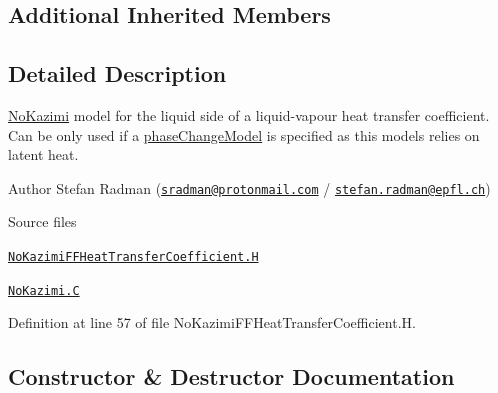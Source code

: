 \subsection*{Additional Inherited Members}


\subsection{Detailed Description}
\hyperlink{classFoam_1_1FFHeatTransferCoefficientModels_1_1NoKazimi}{No\+Kazimi} model for the liquid side of a liquid-\/vapour heat transfer coefficient. Can be only used if a \hyperlink{classFoam_1_1phaseChangeModel}{phase\+Change\+Model} is specified as this models relies on latent heat. 

\label{_Description}%
 Author Stefan Radman (\href{mailto:sradman@protonmail.com}{\tt sradman@protonmail.\+com} / \href{mailto:stefan.radman@epfl.ch}{\tt stefan.\+radman@epfl.\+ch})

\begin{DoxyParagraph}{Source files}

\begin{DoxyItemize}
\item \href{../../../home/carlo/data/GeN-Foam/GeN-Foam_ffn/GeN-Foam/GeN-Foam/classes/thermalHydraulics/src/physicsModels/heatTransferModels/FFHeatTransferCoefficientModels/NoKazimi/NoKazimiFFHeatTransferCoefficient.H}{\tt No\+Kazimi\+F\+F\+Heat\+Transfer\+Coefficient.\+H} 
\item \href{../../../home/carlo/data/GeN-Foam/GeN-Foam_ffn/GeN-Foam/GeN-Foam/classes/thermalHydraulics/src/physicsModels/heatTransferModels/FFHeatTransferCoefficientModels/NoKazimi/NoKazimi.C}{\tt No\+Kazimi.\+C} 
\end{DoxyItemize}
\end{DoxyParagraph}


Definition at line 57 of file No\+Kazimi\+F\+F\+Heat\+Transfer\+Coefficient.\+H.



\subsection{Constructor \& Destructor Documentation}
\mbox{\label{classFoam_1_1FFHeatTransferCoefficientModels_1_1NoKazimi_ae108db9c96c6b2362c958ffd1eedc839}} 
